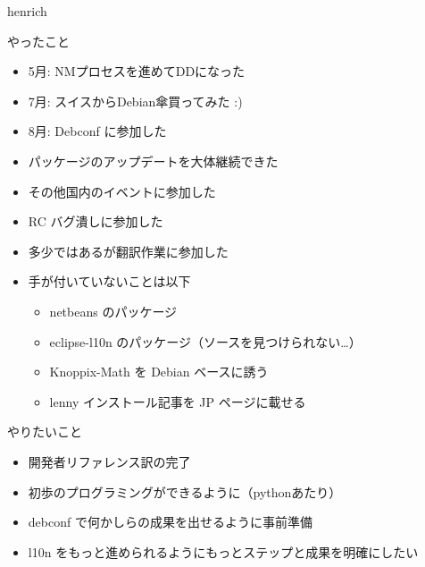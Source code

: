 \begin{prework}{ henrich }

やったこと
\begin{itemize}
 \item 5月: NMプロセスを進めてDDになった
 \item 7月: スイスからDebian傘買ってみた :)
 \item 8月: Debconf に参加した
 \item パッケージのアップデートを大体継続できた
 \item その他国内のイベントに参加した
 \item RC バグ潰しに参加した
 \item 多少ではあるが翻訳作業に参加した
 \item 手が付いていないことは以下
       \begin{itemize}
	\item netbeans のパッケージ
	\item eclipse-l10n のパッケージ（ソースを見つけられない…）
	\item Knoppix-Math を Debian ベースに誘う
	\item lenny インストール記事を JP ページに載せる
       \end{itemize}
\end{itemize}
やりたいこと
\begin{itemize}
 \item 開発者リファレンス訳の完了
 \item 初歩のプログラミングができるように（pythonあたり）
 \item debconf で何かしらの成果を出せるように事前準備
 \item l10n をもっと進められるようにもっとステップと成果を明確にしたい
\end{itemize}
\end{prework}

